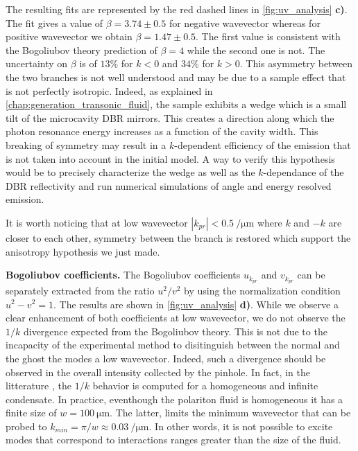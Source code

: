The resulting fits are represented by the red dashed lines in \autoref{fig:uv_analysis} \textbf{c)}. The fit gives a value of $\beta=3.74\pm0.5$ for negative wavevector whereas for positive wavevector we obtain $\beta=1.47\pm{0.5}$. The first value is consistent with the Bogoliubov theory prediction of $\beta=4$ while the second one is not. The uncertainty on $\beta$ is of $13\%$ for $k<0$ and $34\%$ for $k>0$. 
 This asymmetry between the two branches is not well understood and may be due to a sample effect that is not perfectly isotropic. Indeed, 
as explained in \autoref{chap:generation_transonic_fluid}, the sample exhibits a wedge which is a small tilt of the microcavity DBR mirrors. This creates a direction along which the photon resonance energy increases as a function of the cavity width.
This breaking of symmetry may result in a $k$-dependent efficiency of the emission that is not taken into account in the initial model. A way to verify this hypothesis would be to precisely characterize the wedge as well as the $k$-dependance of the DBR reflectivity and run numerical simulations of angle and energy resolved emission. 

It is worth noticing that at low wavevector $|k_{pr}|<\SI{0.5}{\per\micro\meter}$ where $k$ and $-k$ are closer to each other, symmetry between the branch is restored which support the anisotropy hypothesis 
we just made.

\bigskip

\textbf{Bogoliubov coefficients.} The Bogoliubov coefficients $u_{k_{pr}}$ and $v_{k_{pr}}$ can be separately extracted from the ratio $u^2/v^2$ by using the normalization condition $u^2-v^2=1$. The 
results are shown in \autoref{fig:uv_analysis} \textbf{d)}. While we observe a clear enhancement of both coefficients at low wavevector, we do not observe the $1/k$ divergence expected from the Bogoliubov theory. This is not due to the incapacity of the experimental method to disitinguish  between the normal and the ghost the modes a low wavevector. Indeed,
such a divergence should be observed in the overall intensity collected by the pinhole.
In fact, in the litterature \cite{pitaevskij_bose-einstein_2016,castin_bose-einstein_2001,pethick_bose-einstein_2008}, the $1/k$ behavior is computed for a homogeneous and infinite condensate. In practice, eventhough the polariton fluid is homogeneous it has a finite size of $w=\SI{100}{\micro\meter}$. The latter,
limits the minimum wavevector that can be probed to $k_{min}=\pi/w\approx\SI{0.03}{\per\micro\meter}$. In other words, it is not possible to excite modes that correspond to interactions ranges greater than the size of the fluid.

